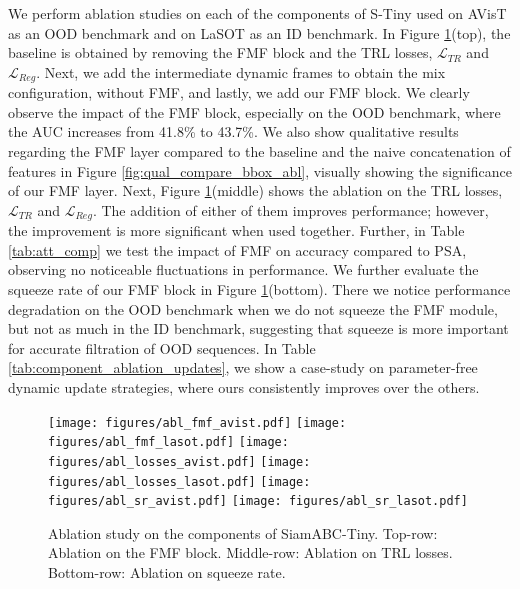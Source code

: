   We perform ablation studies on each of the components of S-Tiny used on AVisT as an OOD benchmark and on LaSOT as an ID benchmark. In Figure \ref{fig:all_ablation}(top), the baseline is obtained by removing the FMF block and the TRL losses, $\mathcal{L}_{TR}$ and $\mathcal{L}_{Reg}$. Next, we add the intermediate dynamic frames to obtain the mix configuration, without FMF, and lastly, we add our FMF block. We clearly observe the impact of the FMF block, especially on the OOD benchmark, where the AUC increases from 41.8\% to 43.7\%. We also show qualitative results regarding the FMF layer compared to the baseline and the naive concatenation of features in Figure \ref{fig:qual_compare_bbox_abl}, visually showing the significance of our FMF layer. 
  Next, Figure \ref{fig:all_ablation}(middle) shows the ablation on the TRL losses, $\mathcal{L}_{TR}$ and $\mathcal{L}_{Reg}$. The addition of either of them improves performance; however, the improvement is more significant when used together.
  Further, in Table \ref{tab:att_comp} we test the impact of FMF on accuracy compared to PSA\cite{liu2021polarized}, observing no noticeable fluctuations in performance.
  We further evaluate the squeeze rate of our FMF block in Figure \ref{fig:all_ablation}(bottom). There we notice performance degradation on the OOD benchmark when we do not squeeze the FMF module, but not as much in the ID benchmark, suggesting that squeeze is more important for accurate filtration of OOD sequences.
  In Table \ref{tab:component_ablation_updates}, we show a case-study on parameter-free dynamic update strategies, where ours consistently improves over the others.
  
  \begin{figure}
	\centering
	 \texttt{[image: figures/abl\_fmf\_avist.pdf]}
	 \texttt{[image: figures/abl\_fmf\_lasot.pdf]}
	 \texttt{[image: figures/abl\_losses\_avist.pdf]}
	 \texttt{[image: figures/abl\_losses\_lasot.pdf]}
	 \texttt{[image: figures/abl\_sr\_avist.pdf]}
	 \texttt{[image: figures/abl\_sr\_lasot.pdf]}
	 \vspace{-4mm}
	 \caption{Ablation study on the components of SiamABC-Tiny. Top-row: Ablation on the FMF block. Middle-row: Ablation on TRL losses. Bottom-row: Ablation on squeeze rate.}
	 \label{fig:all_ablation}
	 \vspace{-5mm}
   \end{figure}


